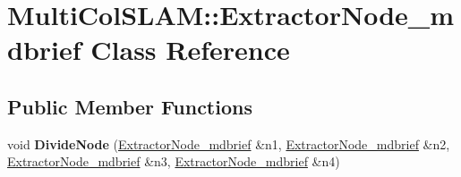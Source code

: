 \hypertarget{classMultiColSLAM_1_1ExtractorNode__mdbrief}{}\section{Multi\+Col\+S\+L\+AM\+:\+:Extractor\+Node\+\_\+mdbrief Class Reference}
\label{classMultiColSLAM_1_1ExtractorNode__mdbrief}
\subsection*{Public Member Functions}
\begin{DoxyCompactItemize}
\item 
void {\bfseries Divide\+Node} (\hyperlink{classMultiColSLAM_1_1ExtractorNode__mdbrief}{Extractor\+Node\+\_\+mdbrief} \&n1, \hyperlink{classMultiColSLAM_1_1ExtractorNode__mdbrief}{Extractor\+Node\+\_\+mdbrief} \&n2, \hyperlink{classMultiColSLAM_1_1ExtractorNode__mdbrief}{Extractor\+Node\+\_\+mdbrief} \&n3, \hyperlink{classMultiColSLAM_1_1ExtractorNode__mdbrief}{Extractor\+Node\+\_\+mdbrief} \&n4)\hypertarget{classMultiColSLAM_1_1ExtractorNode__mdbrief_a6980d601362ad9ea094bcdbb1884b04b}{}\label{classMultiColSLAM_1_1ExtractorNode__mdbrief_a6980d601362ad9ea094bcdbb1884b04b}

\end{DoxyCompactItemize}
